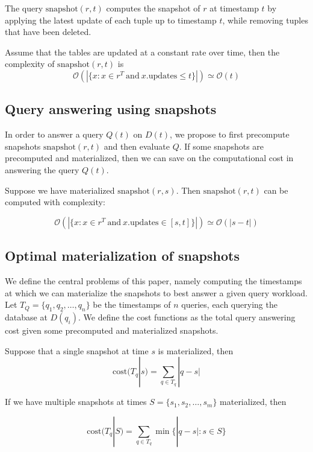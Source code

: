 \vspace{1em}

The query $\mathrm{snapshot}(r, t)$ computes the snapshot of $r$ at timestamp
$t$ by applying the latest update of each tuple up to timestamp $t$, while
removing tuples that have been deleted.

\begin{prop}
    Assume that the tables are updated at a constant rate over time,
    then the complexity of $\mathrm{snapshot}(r, t)$ is 
    $$\mathcal{O}(|\{x: x\in r^T\mathrm{\ and\ } x.\mathrm{updates} \leq t\}|)
    \simeq \mathcal{O}(t)$$
\end{prop}

\subsection{Query answering using snapshots}

In order to answer a query $Q(t)$ on $D(t)$, we propose to first precompute
snapshots $\mathrm{snapshot}(r, t)$ and then evaluate $Q$.  If some snapshots
are precomputed and materialized, then we can save on the computational cost in
answering the query $Q(t)$.

\begin{prop}
    Suppose we have materialized $\mathrm{snapshot}(r, s)$.  Then
    $\mathrm{snapshot}(r, t)$ can be computed with complexity:

    $$\mathcal{O}(|\{x: x\in r^T\mathrm{\ and\ } x.\mathrm{updates} \in [s,
    t]\}|) \simeq \mathcal{O}(|s-t|)$$
\end{prop}

\subsection{Optimal materialization of snapshots}

We define the central problems of this paper, namely computing the timestamps at
which we can materialize the snapshots to best answer a given query workload.
Let $T_Q = \{q_1, q_2, \dots, q_n\}$ be the timestamps of $n$ queries, each 
querying the database at $D(q_i)$.  We define the cost functions as the total
query answering cost given some precomputed and materialized snapshots.

\begin{definition}
    Suppose that a single snapshot at time $s$ is materialized, then
    $$\mathrm{cost}(T_q | s) = \sum_{q\in T_q} |q - s|$$

    If we have multiple snapshots at times $S=\{s_1, s_2, \dots, s_m\}$
    materialized, then

    $$\mathrm{cost}(T_q|S) = \sum_{q\in T_q} \min\{|q-s| : s\in S\}$$
\end{definition}

